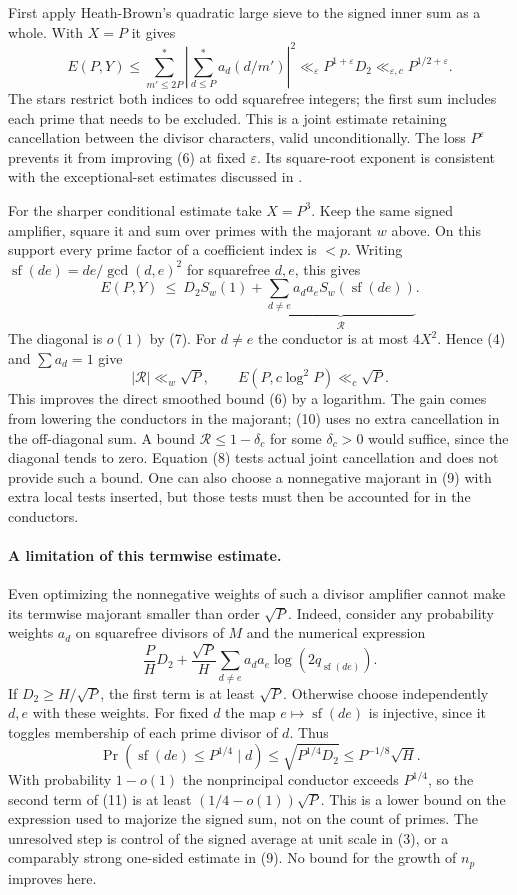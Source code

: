 \documentclass[11pt]{article}
\newcommand{\sfk}{\operatorname{sf}}
\newcommand{\ep}{\varepsilon}
\begin{document}
First apply Heath-Brown's quadratic large sieve \cite[Theorem 1]{hb}
to the signed inner sum as a whole. With $X=P$ it gives
\[
 E(P,Y)\le\sum_{m'\le2P}^{*}
      \left|\sum_{d\le P}^{*}a_d(d/m')\right|^2
 \ll_\ep P^{1+\ep}D_2 \ll_{\ep,c} P^{1/2+\ep}.
 \tag{8}
\]
The stars restrict both indices to odd squarefree integers; the first
sum includes each prime that needs to be excluded. This is a joint
estimate retaining cancellation between the divisor characters, valid
unconditionally. The loss $P^\ep$ prevents it from improving (6) at
fixed $\ep$. Its square-root exponent is consistent with the exceptional-set
estimates discussed in \cite[Introduction]{lw}.

For the sharper conditional estimate take $X=P^3$. Keep the same signed
amplifier, square it and sum over primes with the majorant $w$ above.
On this support every prime factor of a coefficient index is $<p$.
Writing $\sfk(de)=de/\gcd(d,e)^2$ for squarefree $d,e$, this gives
\[
 E(P,Y)\ \le\ D_2 S_w(1)+
    \underbrace{\sum_{d\ne e}a_d a_e S_w(\sfk(de))}_{\mathcal R}.
 \tag{9}
\]
The diagonal is $o(1)$ by (7). For $d\ne e$ the conductor is at most
$4X^2$. Hence (4) and $\sum a_d=1$ give
\[
 |\mathcal R|\ll_w\sqrt P,\qquad E(P,c\log^2 P)\ll_c\sqrt P .
 \tag{10}
\]
This improves the direct smoothed bound (6) by a logarithm. The gain
comes from lowering the conductors in the majorant; (10) uses no
extra cancellation in the off-diagonal sum. A bound
$\mathcal R\le1-\delta_c$ for some $\delta_c>0$ would suffice, since
the diagonal tends to zero. Equation (8) tests actual joint cancellation
and does not provide such a bound. One can also choose a nonnegative
majorant in (9) with extra local tests inserted, but those tests
must then be accounted for in the conductors.

\paragraph{A limitation of this termwise estimate.}
Even optimizing the nonnegative weights of such a divisor amplifier
cannot make its termwise majorant smaller than order $\sqrt P$.
Indeed, consider any probability weights $a_d$ on squarefree
divisors of $M$ and the numerical expression
\[
 \frac{P}{H}D_2+\frac{\sqrt P}{H}
   \sum_{d\ne e}a_d a_e\log(2q_{\sfk(de)}).
 \tag{11}
\]
If $D_2\ge H/\sqrt P$, the first term is at least $\sqrt P$. Otherwise
choose independently $d,e$ with these weights. For fixed $d$ the map
$e\mapsto\sfk(de)$ is injective, since it toggles membership of each
prime divisor of $d$. Thus
\[
 \Pr(\sfk(de)\le P^{1/4}\mid d)
 \le \sqrt{P^{1/4}D_2}\le P^{-1/8}\sqrt H .
\]
With probability $1-o(1)$ the nonprincipal conductor exceeds $P^{1/4}$,
so the second term of (11) is at least $(1/4-o(1))\sqrt P$.
This is a lower bound on the expression used to majorize the signed
sum, not on the count of primes. The unresolved step is control of
the signed average at unit scale in (3), or a comparably strong
one-sided estimate in (9). No bound for the growth of $n_p$ improves here.
\end{document}
